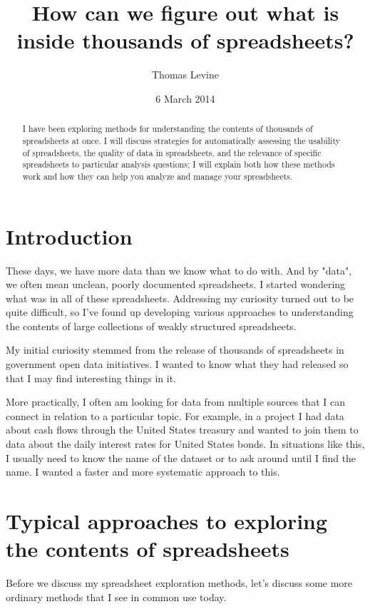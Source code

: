 \documentclass{acm_proc_article-sp}
\begin{document}
\title{How can we figure out what is inside thousands of spreadsheets?}
\author{ \alignauthor Thomas Levine\\  }
\date{6 March 2014}
\maketitle
\begin{abstract}
I have been exploring methods for understanding the contents
of thousands of spreadsheets at once. I will discuss strategies for automatically
assessing the usability of spreadsheets, the quality of data
in spreadsheets, and the relevance of specific spreadsheets to particular
analysis questions; I will explain both how these methods work and how they
can help you analyze and manage your spreadsheets.
\end{abstract}


\section{Introduction}
These days, we have more data than we know what to do with. And by "data",
we often mean unclean, poorly documented spreadsheets. I started wondering
what was in all of these spreadsheets. Addressing my curiosity turned out
to be quite difficult, so I've found up developing various approaches to
understanding the contents of large collections of weakly structured
spreadsheets.

My initial curiosity stemmed from the release of thousands of spreadsheets
in government open data initiatives. I wanted to know what they had released
so that I may find interesting things in it.

More practically, I often am looking for data from multiple sources that I
can connect in relation to a particular topic. For example, in a project I had
data about cash flows through the United States treasury and wanted to join
them to data about the daily interest rates for United States bonds. In situations
like this, I usually need to know the name of the dataset or to ask around until
I find the name. I wanted a faster and more systematic approach to this.

\section{Typical approaches to exploring the contents of spreadsheets}
Before we discuss my spreadsheet exploration methods, let's discuss some
more ordinary methods that I see in common use today.
\end{document}

